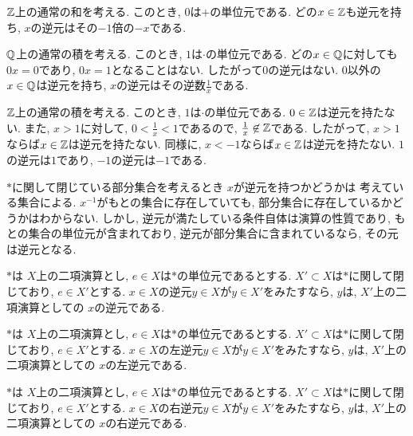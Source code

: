 \begin{example}
  $\mathbb{Z}$上の通常の和を考える.
  このとき, $0$は$+$の単位元である.
  どの$x\in \mathbb{Z}$も逆元を持ち,
  $x$の逆元はその$-1$倍の$-x$である.
\end{example}
\begin{example}
  $\mathbb{Q}$上の通常の積を考える.
  このとき, $1$は$\cdot$の単位元である.
  どの$x\in\mathbb{Q}$に対しても$0x=0$であり,
  $0x=1$となることはない.
  したがって$0$の逆元はない.
  $0$以外の$x\in \mathbb{Q}$は逆元を持ち,
  $x$の逆元はその逆数$\frac{1}{x}$である.
\end{example}
\begin{example}
  $\mathbb{Z}$上の通常の積を考える.
  このとき, $1$は$\cdot$の単位元である.
  $0\in\mathbb{Z}$は逆元を持たない.
  また, $x>1$に対して,
  $0<\frac{1}{x}<1$であるので,
  $\frac{1}{x}\not\in \mathbb{Z}$である.
  したがって, $x>1$ならば$x\in\mathbb{Z}$は逆元を持たない.
  同様に, $x<-1$ならば$x\in \mathbb{Z}$は逆元を持たない.
  $1$の逆元は$1$であり,
  $-1$の逆元は$-1$である.
\end{example}

$\ast$に関して閉じている部分集合を考えるとき
$x$が逆元を持つかどうかは
考えている集合による.
$x^{-1}$がもとの集合に存在していても,
部分集合に存在しているかどうかはわからない.
しかし,
逆元が満たしている条件自体は演算の性質であり,
もとの集合の単位元が含まれており,
逆元が部分集合に含まれているなら,
その元は逆元となる.
\begin{prop}
  $\ast$は
  $X$上の二項演算とし,
  $e\in X$は$\ast$の単位元であるとする.
  $X'\subset X$は$\ast$に関して閉じており,
  $e\in X'$とする.
  $x\in X$の逆元$y\in X$が$y\in X'$をみたすなら,
  $y$は,
  $X'$上の二項演算としての
  $x$の逆元である.
\end{prop}
\begin{prop}
  $\ast$は
  $X$上の二項演算とし,
  $e\in X$は$\ast$の単位元であるとする.
  $X'\subset X$は$\ast$に関して閉じており,
  $e\in X'$とする.
  $x\in X$の左逆元$y\in X$が$y\in X'$をみたすなら,
  $y$は,
  $X'$上の二項演算としての
  $x$の左逆元である.
\end{prop}
\begin{prop}
  $\ast$は
  $X$上の二項演算とし,
  $e\in X$は$\ast$の単位元であるとする.
  $X'\subset X$は$\ast$に関して閉じており,
  $e\in X'$とする.
  $x\in X$の右逆元$y\in X$が$y\in X'$をみたすなら,
  $y$は,
  $X'$上の二項演算としての
  $x$の右逆元である.
\end{prop}


